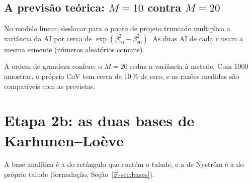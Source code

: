 \documentclass[11pt,a4paper]{article}
\begin{document}
\subsection{A previsão teórica: $M = 10$ contra $M = 20$}
No modelo linear, deslocar para o ponto de projeto truncado multiplica a variância da AI por cerca de
$\exp(\beta_{10}^2 - \beta_{20}^2)$. As duas AI de cada $r$ usam a mesma semente (números aleatórios comuns).
\begin{table}[H]\centering\small
{}
\caption{A razão das variâncias das AI com o ponto de projeto de $M = 10$ e de $M = 20$.}
\end{table}
A ordem de grandeza confere: o $M = 20$ reduz a variância à metade. Com 1000 amostras, o próprio CoV tem cerca de 10\,\% de
erro, e as razões medidas são compatíveis com as previstas.

\section{Etapa 2b: as duas bases de Karhunen--Loève}\label{sec:bases}
A base analítica é a do retângulo que contém o talude, e a de Nyström é a do próprio talude (formulação,
Seção~\ref{F-sec:bases}).
\end{document}

